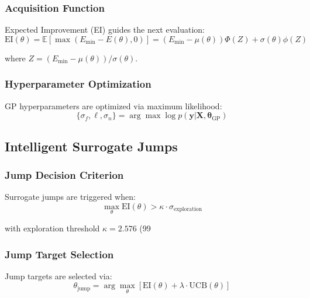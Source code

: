 \subsubsection{Acquisition Function}

Expected Improvement (EI) guides the next evaluation:
\begin{equation}
\text{EI}(\theta) = \mathbb{E}[\max(E_{\text{min}} - E(\theta), 0)] = (E_{\text{min}} - \mu(\theta))\Phi(Z) + \sigma(\theta)\phi(Z)
\end{equation}

where $Z = (E_{\text{min}} - \mu(\theta))/\sigma(\theta)$.

\subsubsection{Hyperparameter Optimization}

GP hyperparameters are optimized via maximum likelihood:
\begin{equation}
\{\sigma_f, \ell, \sigma_n\} = \arg\max \log p(\mathbf{y}|\mathbf{X}, \boldsymbol{\theta}_{\text{GP}})
\end{equation}

\subsection{Intelligent Surrogate Jumps}

\subsubsection{Jump Decision Criterion}

Surrogate jumps are triggered when:
\begin{equation}
\max_{\theta} \text{EI}(\theta) > \kappa \cdot \sigma_{\text{exploration}}
\end{equation}

with exploration threshold $\kappa = 2.576$ (99%

\subsubsection{Jump Target Selection}

Jump targets are selected via:
\begin{equation}
\theta_{\text{jump}} = \arg\max_{\theta} \left[\text{EI}(\theta) + \lambda \cdot \text{UCB}(\theta)\right]
\end{equation}

